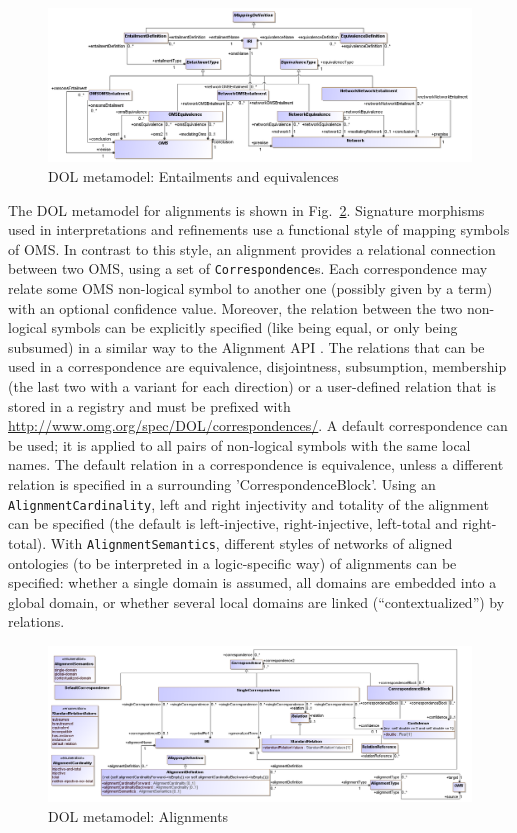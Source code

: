 \documentclass[10pt, a4paper]{isov2}
\newcommand*{\termref}[1]{\index{#1}#1\xspace}
\newcommand*{\syntax}[1]{\texttt{#1}}
\begin{document}
\begin{figure}
  \centering
    \includegraphics[scale=0.39]{mof/entailment&equivalence.png}
  \caption{DOL metamodel: Entailments and equivalences}
  \label{fig:entailment&equivalence}
\end{figure}


The DOL metamodel for alignments is shown in 
Fig.~\ref{fig:alignment}.
Signature morphisms used in interpretations and refinements use
a functional style of mapping symbols of OMS.
In contrast to this style, an alignment provides a relational 
connection between two OMS,  using a set of \syntax{Correspondence}s. Each correspondence may relate 
some OMS non-logical symbol to another one (possibly given by a term) with an optional confidence 
value. Moreover, the relation between the two non-logical symbols can be explicitly
specified (like being equal, or only being subsumed) in a similar way to the Alignment API \cite{AlignmentAPI}. 
The relations that can be used in a correspondence are equivalence, disjointness, subsumption, membership (the last two with a
variant for each direction) or a user-defined relation that is stored in a registry and must be prefixed with
\url{http://www.omg.org/spec/DOL/correspondences/}.
A default correspondence can be used; it is applied to all pairs of non-logical symbols with 
the same local names. The default relation in a correspondence is equivalence, unless  a different 
relation is specified in a surrounding 
'CorrespondenceBlock'.
Using an \syntax{AlignmentCardinality}, left and right injectivity and totality of the
\termref{alignment} can be specified (the default is left-injective, right-injective, left-total  and right-total).
With \syntax{AlignmentSemantics}, different styles of networks of aligned ontologies (to be interpreted in 
a logic-specific way) of alignments can be specified: whether a single domain is assumed, all domains are embedded into a global domain,
or whether several local domains are linked (``contextualized'') by relations.

\begin{figure}
  \centering
    \includegraphics[scale=0.43]{mof/alignment.png}
  \caption{DOL metamodel: Alignments}
  \label{fig:alignment}
\end{figure}
\end{document}
